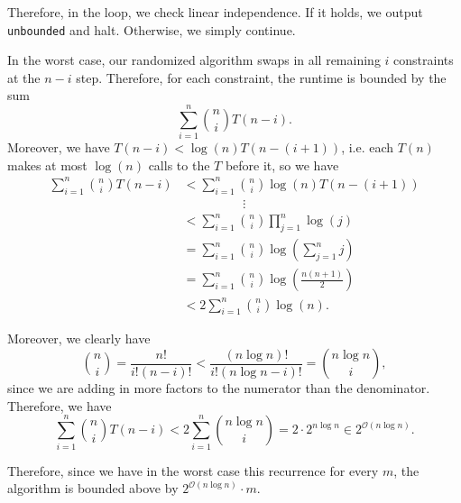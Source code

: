 \documentclass{article}
\newcommand{\problempart}[1]{\noindent{\textbf{(#1)}}}
\begin{document}
Therefore, in the loop, we check linear independence. If it holds, we output \texttt{unbounded} and halt. Otherwise, we simply continue.

\problempart{b} In the worst case, our randomized algorithm swaps in all remaining $i$ constraints at the $n-i$ step. Therefore, for each constraint, the runtime is bounded by the sum
\[\sum_{i=1}^n \binom{n}{i} T(n-i).\]
Moreover, we have $T(n-i)<\log(n)T(n-(i+1))$, i.e. each $T(n)$ makes at most $\log(n)$ calls to the $T$ before it, so we have
\begin{align*}\sum_{i=1}^n \binom{n}{i} T(n-i)&<\sum_{i=1}^n \binom{n}{i}\log(n) T(n-(i+1))\\
&\hspace{2cm}\vdots\\
&<\sum_{i=1}^n \binom{n}{i} \prod_{j=1}^n \log(j)\\
&=\sum_{i=1}^n \binom{n}{i} \log\left(\sum_{j=1}^{n} j\right)\\
&=\sum_{i=1}^n \binom{n}{i} \log\left(\frac{n(n+1)}{2}\right)\\
&<2\sum_{i=1}^n \binom{n}{i} \log(n).\end{align*}

Moreover, we clearly have
\[\binom{n}{i}=\frac{n!}{i!(n-i)!}<\frac{(n\log n)!}{i!(n\log n - i)!} = \binom{n\log n}{i},\]
since we are adding in more factors to the numerator than the denominator. Therefore, we have
\[\sum_{i=1}^n \binom{n}{i} T(n-i) < 2\sum_{i=1}^n \binom{n\log n}{i} = 2\cdot 2^{n\log n} \in 2^{\mathcal{O}(n\log n)}.\]

Therefore, since we have in the worst case this recurrence for every $m$, the algorithm is bounded above by $2^{\mathcal{O}(n\log n)}\cdot m$.
\end{document}
